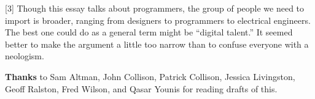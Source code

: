 {[}3{]} Though this essay talks about programmers, the group of people
we need to import is broader, ranging from designers to programmers to
electrical engineers. The best one could do as a general term might be
``digital talent.'' It seemed better to make the argument a little too
narrow than to confuse everyone with a neologism.

\textbf{Thanks} to Sam Altman, John Collison, Patrick Collison, Jessica
Livingston, Geoff Ralston, Fred Wilson, and Qasar Younis for reading
drafts of this.
